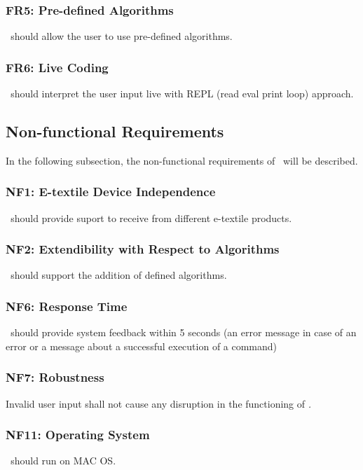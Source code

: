 \subsubsection{FR5: Pre-defined Algorithms}
\textit\ should allow the user to use pre-defined algorithms.

\subsubsection{FR6: Live Coding}
\textit\ should interpret the user input live with REPL (read eval print loop) approach.



\subsection{Non-functional Requirements}

In the following subsection, the non-functional requirements of \textit\ will be described.

\subsubsection{NF1: E-textile Device Independence} 
\textit\ should provide suport to receive from different e-textile products.

\subsubsection{NF2: Extendibility with Respect to Algorithms} 
\textit\ should support the addition of defined algorithms.

\subsubsection{NF6: Response Time}
\textit\ should provide system feedback within 5 seconds (an error message in case of an error or a message about a successful execution of a command)

\subsubsection{NF7: Robustness}
Invalid user input shall not cause any disruption in the functioning of \textit.

\subsubsection{NF11: Operating System}

\textit\ should run on MAC OS. 
